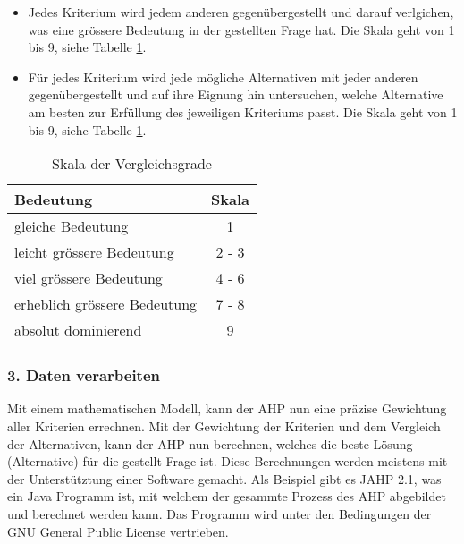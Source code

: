   \begin{itemize}
    \item Jedes Kriterium wird jedem anderen gegenübergestellt und darauf
    verlgichen, was eine grössere Bedeutung in der gestellten Frage hat. Die
    Skala geht von 1 bis 9, siehe Tabelle \ref{tab:vergleichsgrade}.
    \item Für jedes Kriterium wird jede mögliche Alternativen mit jeder anderen
    gegenübergestellt und auf ihre Eignung hin untersuchen, welche Alternative
    am besten zur Erfüllung des jeweiligen Kriteriums passt. Die Skala geht von
    1 bis 9, siehe Tabelle \ref{tab:vergleichsgrade}.
  \end{itemize}
  
  \begin{table}[h]
    \begin{center}
      \begin{tabular}{lc}
        \toprule
        Bedeutung & Skala\\
        \midrule
        gleiche Bedeutung & 1\\
        leicht grössere Bedeutung & 2 - 3\\
        viel grössere Bedeutung & 4 - 6\\
        erheblich grössere Bedeutung & 7 - 8\\
        absolut dominierend & 9\\
        \bottomrule
      \end{tabular}
      \caption{Skala der Vergleichsgrade}
      \label{tab:vergleichsgrade}
    \end{center}
  \end{table}
    
  \subsubsection{3. Daten verarbeiten}
  
  Mit einem mathematischen Modell, kann der \ac{AHP} nun eine präzise Gewichtung
  aller Kriterien errechnen. Mit der Gewichtung der Kriterien und dem Vergleich
  der Alternativen, kann der \ac{AHP} nun berechnen, welches die beste Lösung
  (Alternative) für die gestellt Frage ist.
  Diese Berechnungen werden meistens mit der Unterstütztung einer Software
  gemacht. Als Beispiel gibt es JAHP 2.1, was ein Java Programm ist, mit 
  welchem der gesammte Prozess des \ac{AHP} abgebildet und berechnet werden
  kann. Das Programm wird unter den Bedingungen der GNU General Public License
  vertrieben.
    
